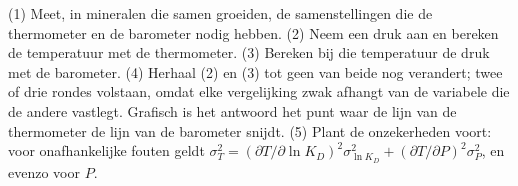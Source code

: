 \begin{method}\label{met:b2:pt-paths:intersection}
(1) Meet, in mineralen die samen groeiden, de samenstellingen die de thermometer en de
barometer nodig hebben. (2) Neem een druk aan en bereken de temperatuur met de thermometer.
(3) Bereken bij die temperatuur de druk met de barometer. (4) Herhaal (2) en (3)
tot geen van beide nog verandert; twee of drie rondes volstaan, omdat elke vergelijking zwak afhangt van
de variabele die de andere vastlegt. Grafisch is het antwoord het punt waar de lijn van de
thermometer de lijn van de barometer snijdt. (5) Plant de onzekerheden voort: voor
onafhankelijke fouten geldt $\sigma_T^2 = (\partial T/\partial\ln K_D)^2\sigma_{\ln K_D}^2 +
(\partial T/\partial P)^2\sigma_P^2$, en evenzo voor $P$.
\end{method}

